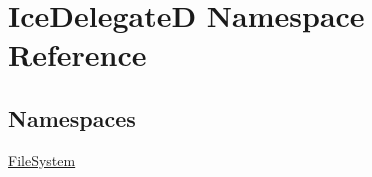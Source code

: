 \hypertarget{namespace_ice_delegate_d}{}\section{Ice\+Delegate\+D Namespace Reference}
\label{namespace_ice_delegate_d}
\subsection*{Namespaces}
\begin{DoxyCompactItemize}
\item 
 \hyperlink{namespace_ice_delegate_d_1_1_file_system}{File\+System}
\end{DoxyCompactItemize}
